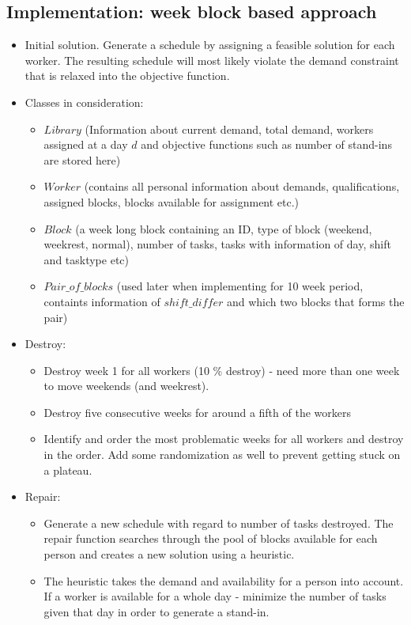 \documentclass{article}
\begin{document}
	\subsection*{Implementation: week block based approach}
	\begin{itemize}
	\item Initial solution. Generate a schedule by assigning a feasible solution for each worker. The resulting schedule will most likely violate the demand constraint that is relaxed into the objective function.
	
	\item Classes in consideration:
		\begin{itemize}
		\item $Library$ (Information about current demand, total demand, workers assigned at a day $d$ and objective functions such as number of stand-ins are stored here)
		\item $Worker$ (contains all personal information about demands, qualifications, assigned blocks, blocks available for assignment etc.)
		\item $Block$ (a week long block containing an ID, type of block (weekend, weekrest, normal), number of tasks, tasks with information of day, shift and tasktype etc)
		\item $Pair\_of\_blocks$ (used later when implementing for 10 week period, containts information of $shift\_differ$ and which two blocks that forms the pair)
		\end{itemize}
		
	\item Destroy:
		\begin{itemize}
		\item Destroy week 1 for all workers (10 \% destroy) - need more than one week to move weekends (and weekrest).
		\item Destroy five consecutive weeks for around a fifth of the workers
		\item Identify and order the most problematic weeks for all workers and destroy in the order. Add some randomization as well to prevent getting stuck on a plateau.
		\end{itemize}
	\item Repair:
		\begin{itemize}
		\item Generate a new schedule with regard to number of tasks destroyed. The repair function searches through the pool of blocks available for each person and creates a new solution using a heuristic.
		\item The heuristic takes the demand and availability for a person into account. If a worker is available for a whole day - minimize the number of tasks given that day in order to generate a stand-in. 
		\end{itemize}
	\end{itemize}
\end{document}
